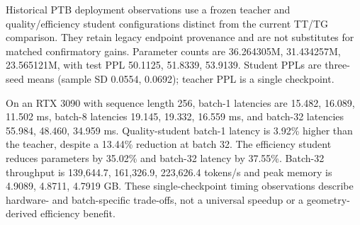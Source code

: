 Historical PTB deployment observations use a frozen teacher and quality/efficiency student configurations distinct from the current TT/TG comparison. They retain legacy endpoint provenance and are not substitutes for matched confirmatory gains. Parameter counts are 36.264305M, 31.434257M, 23.565121M, with test PPL 50.1125, 51.8339, 53.9139. Student PPLs are three-seed means (sample SD 0.0554, 0.0692); teacher PPL is a single checkpoint.

On an RTX 3090 with sequence length 256, batch-1 latencies are 15.482, 16.089, 11.502 ms, batch-8 latencies 19.145, 19.332, 16.559 ms, and batch-32 latencies 55.984, 48.460, 34.959 ms. Quality-student batch-1 latency is 3.92\% higher than the teacher, despite a 13.44\% reduction at batch 32. The efficiency student reduces parameters by 35.02\% and batch-32 latency by 37.55\%. Batch-32 throughput is 139,644.7, 161,326.9, 223,626.4 tokens/s and peak memory is 4.9089, 4.8711, 4.7919 GB. These single-checkpoint timing observations describe hardware- and batch-specific trade-offs, not a universal speedup or a geometry-derived efficiency benefit.
